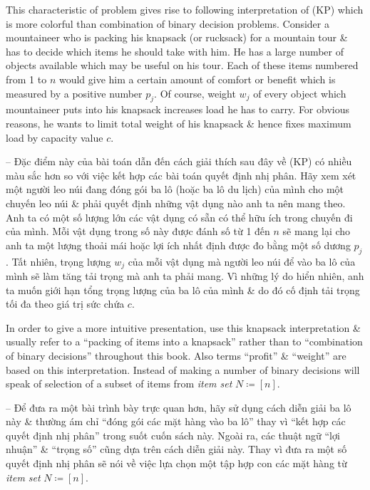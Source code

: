 \documentclass{article}
\begin{document}
\begin{itemize}
\begin{itemize}
        This characteristic of problem gives rise to following interpretation of (KP) which is more colorful than combination of binary decision problems. Consider a mountaineer who is packing his knapsack (or rucksack) for a mountain tour \& has to decide which items he should take with him. He has a large number of objects available which may be useful on his tour. Each of these items numbered from 1 to $n$ would give him a certain amount of comfort or benefit which is measured by a positive number $p_j$. Of course, weight $w_j$ of every object which mountaineer puts into his knapsack increases load he has to carry. For obvious reasons, he wants to limit total weight of his knapsack \& hence fixes maximum load by capacity value $c$.
        
        -- Đặc điểm này của bài toán dẫn đến cách giải thích sau đây về (KP) có nhiều màu sắc hơn so với việc kết hợp các bài toán quyết định nhị phân. Hãy xem xét một người leo núi đang đóng gói ba lô (hoặc ba lô du lịch) của mình cho một chuyến leo núi \& phải quyết định những vật dụng nào anh ta nên mang theo. Anh ta có một số lượng lớn các vật dụng có sẵn có thể hữu ích trong chuyến đi của mình. Mỗi vật dụng trong số này được đánh số từ 1 đến $n$ sẽ mang lại cho anh ta một lượng thoải mái hoặc lợi ích nhất định được đo bằng một số dương $p_j$. Tất nhiên, trọng lượng $w_j$ của mỗi vật dụng mà người leo núi để vào ba lô của mình sẽ làm tăng tải trọng mà anh ta phải mang. Vì những lý do hiển nhiên, anh ta muốn giới hạn tổng trọng lượng của ba lô của mình \& do đó cố định tải trọng tối đa theo giá trị sức chứa $c$.
        
        In order to give a more intuitive presentation, use this knapsack interpretation \& usually refer to a ``packing of items into a knapsack'' rather than to ``combination of binary decisions'' throughout this book. Also terms ``profit'' \& ``weight'' are based on this interpretation. Instead of making a number of binary decisions will speak of selection of a subset of items from {\it item set} $N\coloneqq[n]$.
        
        -- Để đưa ra một bài trình bày trực quan hơn, hãy sử dụng cách diễn giải ba lô này \& thường ám chỉ ``đóng gói các mặt hàng vào ba lô'' thay vì ``kết hợp các quyết định nhị phân'' trong suốt cuốn sách này. Ngoài ra, các thuật ngữ ``lợi nhuận'' \& ``trọng số'' cũng dựa trên cách diễn giải này. Thay vì đưa ra một số quyết định nhị phân sẽ nói về việc lựa chọn một tập hợp con các mặt hàng từ {\it item set} $N\coloneqq[n]$.
        

\end{itemize}
\end{itemize}
\end{document}
